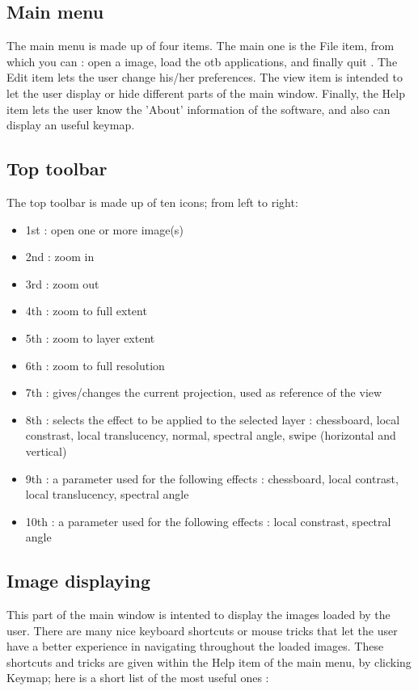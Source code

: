 \subsection{Main menu}
The main menu is made up of four items.
The main one is the File item, from which you can : open a image, load the otb applications, and finally quit \mont.
The Edit item lets the user change his/her preferences. The view item is intended to let the user display or hide different parts of the main window.
Finally, the Help item lets the user know the 'About' information of the software, and also can display an useful keymap.

\subsection{Top toolbar}
The top toolbar is made up of ten icons; from left to right:
\begin{itemize}
\item 1st : open one or more image(s)
\item 2nd : zoom in
\item 3rd : zoom out
\item 4th : zoom to full extent
\item 5th : zoom to layer extent
\item 6th : zoom to full resolution
\item 7th : gives/changes the current projection, used as reference of the view 
\item 8th : selects the effect to be applied to the selected layer : chessboard, local constrast, local translucency, normal, spectral angle, swipe (horizontal and vertical)
\item 9th : a parameter used for the following effects : chessboard, local contrast, local translucency, spectral angle
\item 10th : a parameter used for the following effects :  local constrast, spectral angle
\end{itemize}

\subsection{Image displaying}
This part of the main window is intented to display the images loaded by the user.
There are many nice keyboard shortcuts or mouse tricks that let the user have a better experience in navigating throughout the loaded images.
These shortcuts and tricks are given within the Help item of the main menu, by clicking Keymap; here is a short list of the most useful ones :

